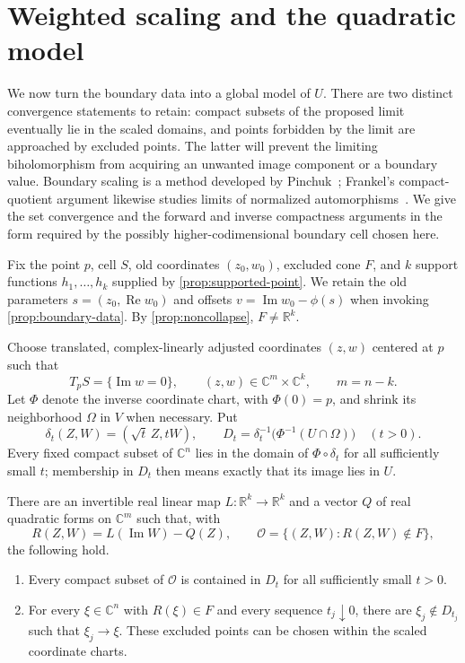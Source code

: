 \section{Weighted scaling and the quadratic model}
\label{sec:scaling}

We now turn the boundary data into a global model of $U$.  There are two distinct convergence statements to retain: compact subsets of the proposed limit eventually lie in the scaled domains, and points forbidden by the limit are approached by excluded points.  The latter will prevent the limiting biholomorphism from acquiring an unwanted image component or a boundary value. Boundary scaling is a method developed by Pinchuk~\cite[Section~2, pp.~73--75]{Pinchuk1981}; Frankel's compact-quotient argument likewise studies limits of normalized automorphisms~\cite[Section~3]{Frankel1989}. We give the set convergence and the forward and inverse compactness arguments in the form required by the possibly higher-codimensional boundary cell chosen here.

Fix the point $p$, cell $S$, old coordinates $(z_0,w_0)$, excluded cone $F$, and $k$ support functions $h_1,\ldots,h_k$ supplied by \cref{prop:supported-point}.  We retain the old parameters $s=(z_0,\operatorname{Re}w_0)$ and offsets $v=\operatorname{Im}w_0-\phi(s)$ when invoking \cref{prop:boundary-data}.  By \cref{prop:noncollapse}, $F\ne\mathbb{R}^k$.

Choose translated, complex-linearly adjusted coordinates $(z,w)$ centered at $p$ such that
\[
 T_pS=\{\operatorname{Im}w=0\},
 \qquad (z,w)\in\mathbb{C}^m\times\mathbb{C}^k,\qquad m=n-k.
\]
Let $\Phi$ denote the inverse coordinate chart, with $\Phi(0)=p$, and shrink its neighborhood $\Omega$ in $V$ when necessary.  Put
\[
 \delta_t(Z,W)=(\sqrt t\,Z,tW),\qquad
 D_t=\delta_t^{-1}\bigl(\Phi^{-1}(U\cap\Omega)\bigr)
 \quad(t>0).
\]
Every fixed compact subset of $\mathbb{C}^n$ lies in the domain of $\Phi\circ\delta_t$ for all sufficiently small $t$; membership in $D_t$ then means exactly that its image lies in $U$.

\begin{proposition}
\label{prop:scaling-limit}
There are an invertible real linear map $L:\mathbb{R}^k\to\mathbb{R}^k$ and a vector $Q$ of real quadratic forms on $\mathbb{C}^m$ such that, with
\[
 R(Z,W)=L(\operatorname{Im}W)-Q(Z),\qquad
 \mathcal{O}=\{(Z,W):R(Z,W)\notin F\},
\]
the following hold.
\begin{enumerate}[label=\textup{(\roman*)}]
\item Every compact subset of $\mathcal{O}$ is contained in $D_t$ for all
sufficiently small $t>0$.
\item For every $\xi\in\mathbb{C}^n$ with $R(\xi)\in F$ and every sequence
$t_j\downarrow0$, there are $\xi_j\notin D_{t_j}$ such that $\xi_j\to\xi$.  These excluded points can be chosen within the scaled coordinate charts.
\end{enumerate}
\end{proposition}

